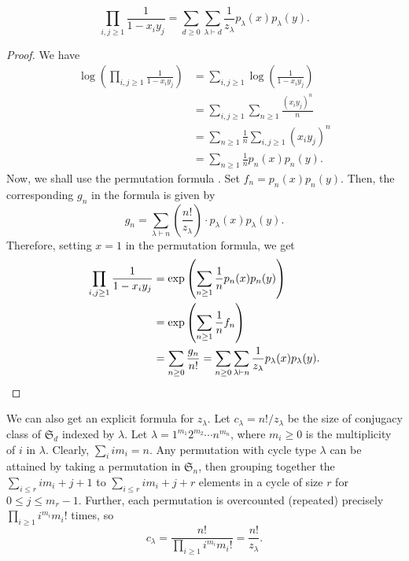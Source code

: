 	\begin{prop}
		\label{prod 1 m xi yj pLpL}
		\[ \prod_{i,j \ge 1} \frac{1}{1-x_iy_j} = \sum_{d \ge 0} \sum_{\lambda \vdash d} \frac{1}{z_\lambda} p_\lambda(x) p_\lambda(y). \]
	\end{prop}
	\begin{proof}
		We have
		\begin{align*}
			\log \left( \prod_{i,j \ge 1} \frac{1}{1-x_iy_j} \right) &= \sum_{i,j \ge 1} \log\left( \frac{1}{1-x_iy_j} \right) \\
				&= \sum_{i,j \ge 1} \sum_{n \ge 1} \frac{(x_iy_j)^n}{n} \\
				&= \sum_{n \ge 1} \frac{1}{n} \sum_{i,j \ge 1} (x_iy_j)^n \\
				&= \sum_{n \ge 1} \frac{1}{n} p_n(x)p_n(y).
		\end{align*}
		Now, we shall use the permutation formula . Set $f_n = p_n(x) p_n(y)$. Then, the corresponding $g_n$ in the formula is given by
		\[ g_n = \sum_{\lambda \vdash n} \left( \frac{n!}{z_\lambda} \right) \cdot p_\lambda(x) p_\lambda(y). \]
		Therefore, setting $x = 1$ in the permutation formula, we get
		\begin{align*}
			\prod_{i,j \ge 1} \frac{1}{1-x_iy_j} &= \exp \left( \sum_{n \ge 1} \frac{1}{n} p_n(x) p_n(y) \right) \\
				&= \exp\left( \sum_{n\ge 1} \frac{1}{n} f_n \right) \\
				&= \sum_{n \ge 0} \frac{g_n}{n!} = \sum_{n \ge 0} \sum_{\lambda \vdash n} \frac{1}{z_\lambda} p_\lambda(x) p_\lambda(y). \qedhere
		\end{align*}
	\end{proof}

	We can also get an explicit formula for $z_\lambda$. Let $c_\lambda = n!/z_\lambda$ be the size of conjugacy class of $\mathfrak{S}_d$ indexed by $\lambda$. Let $\lambda = 1^{m_1} 2^{m_2} \cdots n^{m_n}$, where $m_i \ge 0$ is the multiplicity of $i$ in $\lambda$. Clearly, $\sum_i i m_i = n$. Any permutation with cycle type $\lambda$ can be attained by taking a permutation in $\mathfrak{S}_n$, then grouping together the $\sum_{i \le r} i m_i + j + 1$ to $\sum_{i \le r} i m_i + j + r$ elements in a cycle of size $r$ for $0 \le j \le m_r-1$. Further, each permutation is overcounted (repeated) precisely $\prod_{i \ge 1} i^{m_i} m_i!$ times, so
	\[ c_\lambda = \frac{n!}{\prod_{i \ge 1} i^{m_i} m_i!} = \frac{n!}{z_\lambda}. \]

